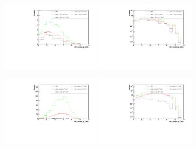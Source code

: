 \begin{figure}[h]
  \begin{center}
	\includegraphics[width=0.45\textwidth]{Plots/aQGC_kinematics/vbf_maxpt_jj_Deta_FM7.pdf}%
	\includegraphics[width=0.45\textwidth]{Plots/aQGC_kinematics/vbf_maxpt_jj_Deta_FM7_log.pdf}\\
    \caption{}
  \end{center}
\end{figure}
\begin{figure}[h]
  \begin{center}
	\includegraphics[width=0.45\textwidth]{Plots/aQGC_kinematics/vbf_maxpt_jj_Deta_FS0.pdf}%
	\includegraphics[width=0.45\textwidth]{Plots/aQGC_kinematics/vbf_maxpt_jj_Deta_FS0_log.pdf}\\
    \caption{}
  \end{center}
\end{figure}
